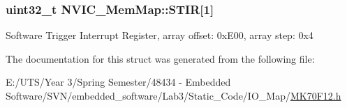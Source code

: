 \subsubsection[{S\+T\+I\+R}]{\setlength{\rightskip}{0pt plus 5cm}uint32\+\_\+t N\+V\+I\+C\+\_\+\+Mem\+Map\+::\+S\+T\+I\+R\mbox{[}1\mbox{]}}\label{struct_n_v_i_c___mem_map_a417658a729224de65052153f5c2cc419}
Software Trigger Interrupt Register, array offset\+: 0x\+E00, array step\+: 0x4 

The documentation for this struct was generated from the following file\+:\begin{DoxyCompactItemize}
\item 
E\+:/\+U\+T\+S/\+Year 3/\+Spring Semester/48434 -\/ Embedded Software/\+S\+V\+N/embedded\+\_\+software/\+Lab3/\+Static\+\_\+\+Code/\+I\+O\+\_\+\+Map/\hyperlink{_m_k70_f12_8h}{M\+K70\+F12.\+h}\end{DoxyCompactItemize}
